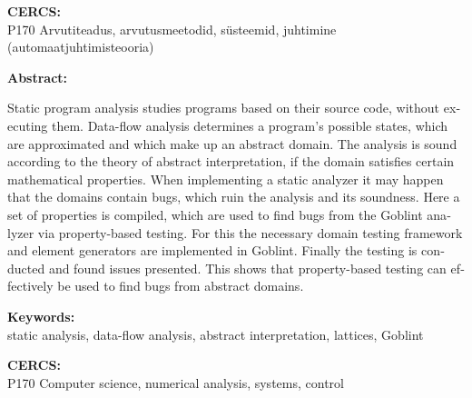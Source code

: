 \documentclass[../thesis.tex]{subfiles}
\begin{document}
\noindent\textbf{CERCS:}\\
P170 Arvutiteadus, arvutusmeetodid, süsteemid, juhtimine (automaatjuhtimisteooria)

\vspace*{5ex}

\begin{otherlanguage}{english}

\noindent\textbf{\large \mytitle}

\vspace*{1ex}

\noindent\textbf{Abstract:}

\noindent
Static program analysis studies programs based on their source code, without executing them.
Data-flow analysis determines a program's possible states, which are approximated and which make up an abstract domain. The analysis is sound according to the theory of abstract interpretation, if the domain satisfies certain mathematical properties.
When implementing a static analyzer it may happen that the domains contain bugs, which ruin the analysis and its soundness.
Here a set of properties is compiled, which are used to find bugs from the Goblint analyzer via property-based testing.
For this the necessary domain testing framework and element generators are implemented in Goblint. Finally the testing is conducted and found issues presented.
This shows that property-based testing can effectively be used to find bugs from abstract domains.

\vspace*{1ex}

\noindent\textbf{Keywords:}\\
static analysis, data-flow analysis, abstract interpretation, lattices, Goblint

\vspace*{1ex}

\noindent\textbf{CERCS:}\\
P170 Computer science, numerical analysis, systems, control

\vspace*{1ex}

\end{otherlanguage} %
\end{document}
